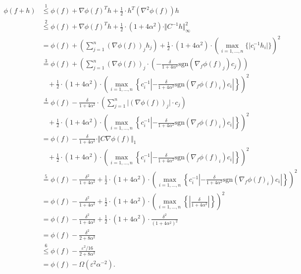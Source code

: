 \begin{align*}
\phi(f+h)&\stackrel{1}{\leq} \phi(f)+\nabla \phi(f)^Th+\frac{1}{2}\cdot h^T\left(\nabla^2\phi(f)\right)h\\
&\stackrel{2}{\leq} \phi(f)+\nabla \phi(f)^Th+\frac{1}{2}\cdot (1+4\alpha^2)\cdot \Vert C^{-1}h\Vert_\infty^2\\
&= \phi(f)+\left(\sum_{j=1}^n\left(\nabla \phi(f)\right)_jh_j\right)+\frac{1}{2}\cdot (1+4\alpha^2)\cdot \left(\max_{i=1,...,n}\{\vert c_i^{-1}h_i\vert\}\right)^2\\
&\stackrel{3}{=} \phi(f)+\left(\sum_{j=1}^n\left(\nabla \phi(f)\right)_j\cdot \left(-\frac{\delta}{1+4\alpha^2}\text{sgn}(\nabla_f\phi(f)_j)c_j\right)\right)\\
&~~~~+\frac{1}{2}\cdot (1+4\alpha^2)\cdot \left(\max_{i=1,...,n}\left\{c_i^{-1}\left\vert -\frac{\delta}{1+4\alpha^2}\text{sgn}(\nabla_f\phi(f)_i)c_i\right\vert\right\}\right)^2\\
&\stackrel{4}{=} \phi(f)-\frac{\delta}{1+4\alpha^2}\cdot \left(\sum_{j=1}^n\vert(\nabla \phi(f))_j\vert\cdot c_j\right)\\
&~~~~+\frac{1}{2}\cdot (1+4\alpha^2)\cdot \left(\max_{i=1,...,n}\left\{c_i^{-1}\left\vert -\frac{\delta}{1+4\alpha^2}\text{sgn}(\nabla_f\phi(f)_i)c_i\right\vert\right\}\right)^2\\
&= \phi(f)-\frac{\delta}{1+4\alpha^2}\cdot \Vert C\nabla\phi(f)\Vert_1\\
&~~~~+\frac{1}{2}\cdot (1+4\alpha^2)\cdot \left(\max_{i=1,...,n}\left\{c_i^{-1}\left\vert -\frac{\delta}{1+4\alpha^2}\text{sgn}(\nabla_f\phi(f)_i)c_i\right\vert\right\}\right)^2\\
&\stackrel{5}{=} \phi(f)-\frac{\delta^2}{1+4\alpha^2}
+\frac{1}{2}\cdot (1+4\alpha^2)\cdot \left(\max_{i=1,...,n}\left\{c_i^{-1}\left \vert -\frac{\delta}{1+4\alpha^2}\text{sgn}(\nabla_f\phi(f)_i)c_i\right\vert\right\}\right)^2\\
&= \phi(f)-\frac{\delta^2}{1+4\alpha^2}
+\frac{1}{2}\cdot (1+4\alpha^2)\cdot \left(\max_{i=1,...,n}\left\{\left\vert\frac{\delta}{1+4\alpha^2}\right\vert\right\}\right)^2\\
&= \phi(f)-\frac{\delta^2}{1+4\alpha^2}
+\frac{1}{2}\cdot (1+4\alpha^2)\cdot \frac{\delta^2}{(1+4\alpha^2)^2}\\
&=\phi(f)-\frac{\delta^2}{2+8\alpha^2}\\
&\stackrel{6}{\leq} \phi(f)-\frac{\varepsilon^2/16}{2+8\alpha^2}\\
&=\phi(f)-\Omega(\varepsilon^2\alpha^{-2}).
\end{align*}

